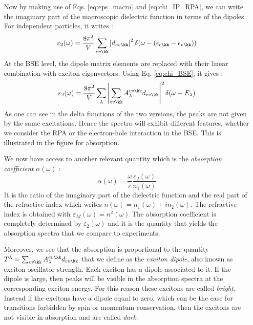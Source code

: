 Now by making use of Eqs. \eqref{eq:eps_macro} and \eqref{eq:chi_IP_RPA}, we can write the imaginary part of the macroscopic dielectric function in terms of the dipoles. For independent particles, it writes :
\begin{equation}
	\varepsilon_2(\omega) = \frac{8\pi^2}{V} \sum_{cv\kk} \left| d_{cv\kk} \right|^2 \delta(\omega - (\epsilon_{c\kk} - \epsilon_{v\kk}) ) \label{eq:eps_2_IP}
\end{equation}
At the \acrshort{BSE} level, the dipole matrix elements are replaced with their linear combination with exciton eigenvectors. Using Eq. \eqref{eq:chi_BSE}, it gives :
\begin{equation}
	\varepsilon_2(\omega) = \frac{8\pi^2}{V} \sum_\lambda \left| \sum_{cv\kk} A_\lambda^{cv\kk} d_{cv\kk} \right|^2 \delta(\omega - E_\lambda) \label{eq:eps_2_exc}
\end{equation}
As one can see in the delta functions of the two versions, the peaks are not given by the same excitations. Hence the spectra will exhibit different features, whether we consider the RPA or the electron-hole interaction in the BSE. This is illustrated in the figure for absorption.

We now have access to another relevant quantity which is the \textit{absorption coefficient} $\alpha(\omega)$ :
\begin{equation}
	\alpha(\omega) = \frac{\omega}{c} \frac{\varepsilon_2(\omega)}{n_1(\omega)} \label{eq:abs_coeff}
\end{equation}
It is the ratio of the imaginary part of the dielectric function and the real part of the refractive index which writes $n(\omega) = n_1(\omega) + i n_2(\omega)$. The refractive index is obtained with $\varepsilon_M(\omega) = n^2(\omega)$
The absorption coefficient is completely determined by $\varepsilon_2(\omega)$ and it is the quantity that yields the absorption spectra that we compare to experiments.\cite{dressel2002electrodynamics}


Moreover, we see that the absorption is proportional to the quantity $T^\lambda = \sum_{cv\kk} A_\lambda^{cv\kk} d_{cv\kk}$ that we define as the \textit{exciton dipole}, also known as exciton oscillator strength. Each exciton has a dipole associated to it. If the dipole is large, then peaks will be visible in the absorption spectra at the corresponding exciton energy. For this reason these excitons are called \textit{bright}. Instead if the excitons have a dipole equal to zero, which can be the case for transitions forbidden by spin or momentum conservation, then the excitons are not visible in absorption and are called \textit{dark}.

